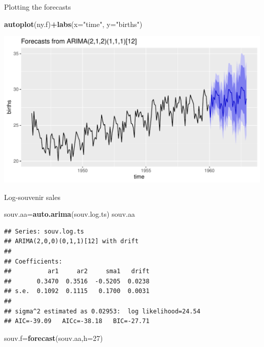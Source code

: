 \documentclass[ignorenonframetext,]{beamer}
\newenvironment{Shaded}{\begin{snugshade}}{\end{snugshade}}
\newcommand{\DataTypeTok}[1]{\textcolor[rgb]{0.13,0.29,0.53}{#1}}
\newcommand{\DecValTok}[1]{\textcolor[rgb]{0.00,0.00,0.81}{#1}}
\newcommand{\KeywordTok}[1]{\textcolor[rgb]{0.13,0.29,0.53}{\textbf{#1}}}
\newcommand{\NormalTok}[1]{#1}
\newcommand{\OperatorTok}[1]{\textcolor[rgb]{0.81,0.36,0.00}{\textbf{#1}}}
\newcommand{\StringTok}[1]{\textcolor[rgb]{0.31,0.60,0.02}{#1}}
\begin{document}
\begin{frame}[fragile]{Plotting the forecasts}
\protect\hypertarget{plotting-the-forecasts}{}

\begin{Shaded}
\begin{Highlighting}[]
\KeywordTok{autoplot}\NormalTok{(ny.f)}\OperatorTok{+}\KeywordTok{labs}\NormalTok{(}\DataTypeTok{x=}\StringTok{"time"}\NormalTok{, }\DataTypeTok{y=}\StringTok{"births"}\NormalTok{)}
\end{Highlighting}
\end{Shaded}

\includegraphics{figure/unnamed-chunk-572-1.pdf}

\end{frame}

\begin{frame}[fragile]{Log-souvenir sales}
\protect\hypertarget{log-souvenir-sales}{}

\begin{Shaded}
\begin{Highlighting}[]
\NormalTok{souv.aa=}\KeywordTok{auto.arima}\NormalTok{(souv.log.ts)}
\NormalTok{souv.aa}
\end{Highlighting}
\end{Shaded}

\begin{verbatim}
## Series: souv.log.ts 
## ARIMA(2,0,0)(0,1,1)[12] with drift 
## 
## Coefficients:
##          ar1     ar2     sma1   drift
##       0.3470  0.3516  -0.5205  0.0238
## s.e.  0.1092  0.1115   0.1700  0.0031
## 
## sigma^2 estimated as 0.02953:  log likelihood=24.54
## AIC=-39.09   AICc=-38.18   BIC=-27.71
\end{verbatim}

\begin{Shaded}
\begin{Highlighting}[]
\NormalTok{souv.f=}\KeywordTok{forecast}\NormalTok{(souv.aa,}\DataTypeTok{h=}\DecValTok{27}\NormalTok{)}
\end{Highlighting}
\end{Shaded}

\end{frame}
\end{document}
